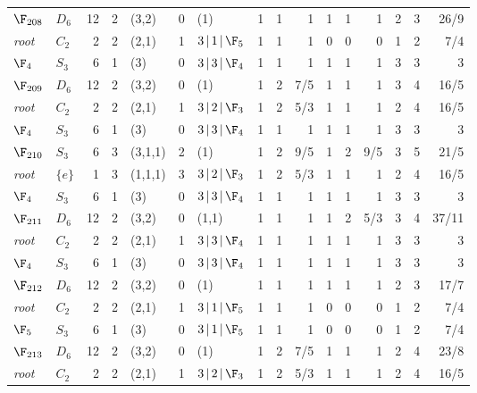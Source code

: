 \begin{landscape}
{\begin{longtable}{@{}l l r r l r l rrr rrr rrr@{}}
\addlinespace[3pt]
\textbf{$\F_{208}$} & $D_{6}$ & 12 & 2 & (3,2) & 0 & (1) & 1 & 1 & 1 & 1 & 1 & 1 & 2 & 3 & 26/9 \\
\quad\textit{root} & $C_{2}$ & 2 & 2 & (2,1) & 1 & $3\,|\,1\,|\,\F_{5}$ & 1 & 1 & 1 & 0 & 0 & 0 & 1 & 2 & 7/4 \\
\quad$\F_{4}$ & $S_{3}$ & 6 & 1 & (3) & 0 & $3\,|\,3\,|\,\F_{4}$ & 1 & 1 & 1 & 1 & 1 & 1 & 3 & 3 & 3 \\
\addlinespace[3pt]
\textbf{$\F_{209}$} & $D_{6}$ & 12 & 2 & (3,2) & 0 & (1) & 1 & 2 & 7/5 & 1 & 1 & 1 & 3 & 4 & 16/5 \\
\quad\textit{root} & $C_{2}$ & 2 & 2 & (2,1) & 1 & $3\,|\,2\,|\,\F_{3}$ & 1 & 2 & 5/3 & 1 & 1 & 1 & 2 & 4 & 16/5 \\
\quad$\F_{4}$ & $S_{3}$ & 6 & 1 & (3) & 0 & $3\,|\,3\,|\,\F_{4}$ & 1 & 1 & 1 & 1 & 1 & 1 & 3 & 3 & 3 \\
\addlinespace[3pt]
\textbf{$\F_{210}$} & $S_{3}$ & 6 & 3 & (3,1,1) & 2 & (1) & 1 & 2 & 9/5 & 1 & 2 & 9/5 & 3 & 5 & 21/5 \\
\quad\textit{root} & $\{e\}$ & 1 & 3 & (1,1,1) & 3 & $3\,|\,2\,|\,\F_{3}$ & 1 & 2 & 5/3 & 1 & 1 & 1 & 2 & 4 & 16/5 \\
\quad$\F_{4}$ & $S_{3}$ & 6 & 1 & (3) & 0 & $3\,|\,3\,|\,\F_{4}$ & 1 & 1 & 1 & 1 & 1 & 1 & 3 & 3 & 3 \\
\addlinespace[3pt]
\textbf{$\F_{211}$} & $D_{6}$ & 12 & 2 & (3,2) & 0 & (1,1) & 1 & 1 & 1 & 1 & 2 & 5/3 & 3 & 4 & 37/11 \\
\quad\textit{root} & $C_{2}$ & 2 & 2 & (2,1) & 1 & $3\,|\,3\,|\,\F_{4}$ & 1 & 1 & 1 & 1 & 1 & 1 & 3 & 3 & 3 \\
\quad$\F_{4}$ & $S_{3}$ & 6 & 1 & (3) & 0 & $3\,|\,3\,|\,\F_{4}$ & 1 & 1 & 1 & 1 & 1 & 1 & 3 & 3 & 3 \\
\addlinespace[3pt]
\textbf{$\F_{212}$} & $D_{6}$ & 12 & 2 & (3,2) & 0 & (1) & 1 & 1 & 1 & 1 & 1 & 1 & 2 & 3 & 17/7 \\
\quad\textit{root} & $C_{2}$ & 2 & 2 & (2,1) & 1 & $3\,|\,1\,|\,\F_{5}$ & 1 & 1 & 1 & 0 & 0 & 0 & 1 & 2 & 7/4 \\
\quad$\F_{5}$ & $S_{3}$ & 6 & 1 & (3) & 0 & $3\,|\,1\,|\,\F_{5}$ & 1 & 1 & 1 & 0 & 0 & 0 & 1 & 2 & 7/4 \\
\addlinespace[3pt]
\textbf{$\F_{213}$} & $D_{6}$ & 12 & 2 & (3,2) & 0 & (1) & 1 & 2 & 7/5 & 1 & 1 & 1 & 2 & 4 & 23/8 \\
\quad\textit{root} & $C_{2}$ & 2 & 2 & (2,1) & 1 & $3\,|\,2\,|\,\F_{3}$ & 1 & 2 & 5/3 & 1 & 1 & 1 & 2 & 4 & 16/5 \\

\end{longtable}}
\end{landscape}
